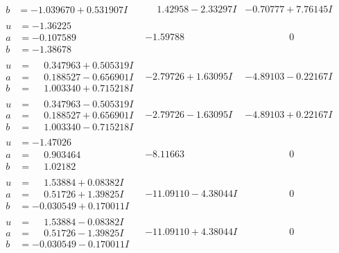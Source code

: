 \documentclass[1p]{elsarticle_modified}
\theoremstyle{definition}
\begin{document}
$$\begin{array}{c|c|c}
\begin{aligned}
b &= -1.039670 + 0.531907 I\end{aligned}
 & \phantom{-}1.42958 - 2.33297 I & -0.70777 + 7.76145 I \\ \hline\begin{aligned}
u &= -1.36225\phantom{ +0.000000I} \\
a &= -0.107589\phantom{ +0.000000I} \\
b &= -1.38678\phantom{ +0.000000I}\end{aligned}
 & -1.59788\phantom{ +0.000000I} & \phantom{-0.000000 } 0 \\ \hline\begin{aligned}
u &= \phantom{-}0.347963 + 0.505319 I \\
a &= \phantom{-}0.188527 - 0.656901 I \\
b &= \phantom{-}1.003340 + 0.715218 I\end{aligned}
 & -2.79726 + 1.63095 I & -4.89103 - 0.22167 I \\ \hline\begin{aligned}
u &= \phantom{-}0.347963 - 0.505319 I \\
a &= \phantom{-}0.188527 + 0.656901 I \\
b &= \phantom{-}1.003340 - 0.715218 I\end{aligned}
 & -2.79726 - 1.63095 I & -4.89103 + 0.22167 I \\ \hline\begin{aligned}
u &= -1.47026\phantom{ +0.000000I} \\
a &= \phantom{-}0.903464\phantom{ +0.000000I} \\
b &= \phantom{-}1.02182\phantom{ +0.000000I}\end{aligned}
 & -8.11663\phantom{ +0.000000I} & \phantom{-0.000000 } 0 \\ \hline\begin{aligned}
u &= \phantom{-}1.53884 + 0.08382 I \\
a &= \phantom{-}0.51726 + 1.39825 I \\
b &= -0.030549 + 0.170011 I\end{aligned}
 & -11.09110 - 4.38044 I & \phantom{-0.000000 } 0 \\ \hline\begin{aligned}
u &= \phantom{-}1.53884 - 0.08382 I \\
a &= \phantom{-}0.51726 - 1.39825 I \\
b &= -0.030549 - 0.170011 I\end{aligned}
 & -11.09110 + 4.38044 I & \phantom{-0.000000 } 0 \\ \hline\begin{aligned}

\end{aligned}
\end{array}$$
\end{document}
